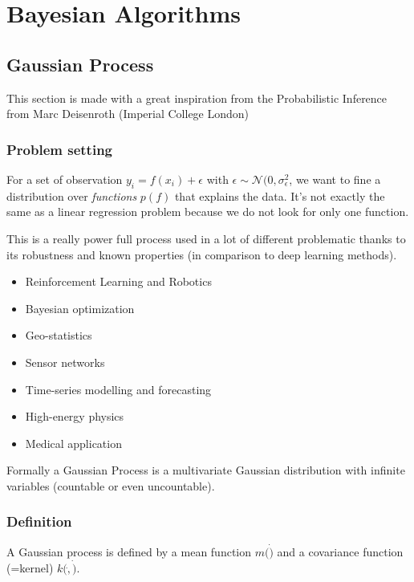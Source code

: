 \chapter{Bayesian Algorithms} %
\label{cha:bayesian_algorithms}

	\section{Gaussian Process}

		This section is made with a great inspiration from the Probabilistic Inference from Marc Deisenroth (Imperial College London)
		\subsection{Problem setting} %
		\label{sub:problem_setting}
			For a set of observation $y_i = f(x_i) + \epsilon$ with $\epsilon \sim \mathcal{N}(0, \sigma_\epsilon^2$, we want to fine a distribution over \emph{functions} $p(f)$ that explains the data. It's not exactly the same as a linear regression problem because we do not look for only one function.

			This is a really power full process used in a lot of different problematic thanks to its robustness and known properties (in comparison to deep learning methods).

			\begin{itemize}
				\item Reinforcement Learning and Robotics
				\item Bayesian optimization
				\item Geo-statistics 
				\item Sensor networks
				\item Time-series modelling and forecasting
				\item High-energy physics
				\item Medical application
			\end{itemize}

			Formally a Gaussian Process is a multivariate Gaussian distribution with infinite variables (countable or even uncountable).

			\subsection{Definition} %
			\label{sub:definition}
				A Gaussian process is defined by a mean function $m(\dot)$ and a covariance function (=kernel) $k(\dot, \dot)$.

